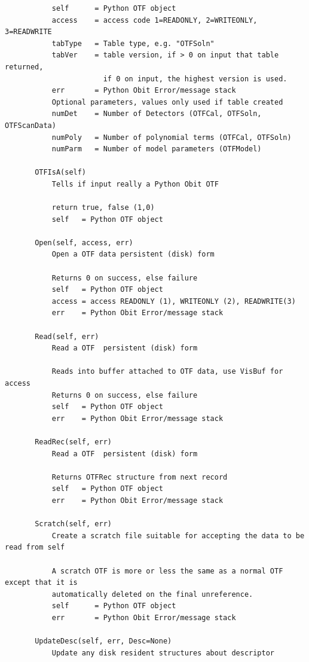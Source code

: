 \documentclass[11pt]{report}
\begin{document}
\begin{verbatim}
           self      = Python OTF object
           access    = access code 1=READONLY, 2=WRITEONLY, 3=READWRITE
           tabType   = Table type, e.g. "OTFSoln"
           tabVer    = table version, if > 0 on input that table returned,
                       if 0 on input, the highest version is used.
           err       = Python Obit Error/message stack
           Optional parameters, values only used if table created
           numDet    = Number of Detectors (OTFCal, OTFSoln, OTFScanData)
           numPoly   = Number of polynomial terms (OTFCal, OTFSoln)
           numParm   = Number of model parameters (OTFModel)
       
       OTFIsA(self)
           Tells if input really a Python Obit OTF
           
           return true, false (1,0)
           self   = Python OTF object
       
       Open(self, access, err)
           Open a OTF data persistent (disk) form
           
           Returns 0 on success, else failure
           self   = Python OTF object
           access = access READONLY (1), WRITEONLY (2), READWRITE(3)
           err    = Python Obit Error/message stack
       
       Read(self, err)
           Read a OTF  persistent (disk) form
           
           Reads into buffer attached to OTF data, use VisBuf for access
           Returns 0 on success, else failure
           self   = Python OTF object
           err    = Python Obit Error/message stack
       
       ReadRec(self, err)
           Read a OTF  persistent (disk) form
           
           Returns OTFRec structure from next record
           self   = Python OTF object
           err    = Python Obit Error/message stack

       Scratch(self, err)
           Create a scratch file suitable for accepting the data to be read from self
           
           A scratch OTF is more or less the same as a normal OTF except that it is
           automatically deleted on the final unreference.
           self      = Python OTF object
           err       = Python Obit Error/message stack
       
       UpdateDesc(self, err, Desc=None)
           Update any disk resident structures about descriptor
           

\end{verbatim}
\end{document}
